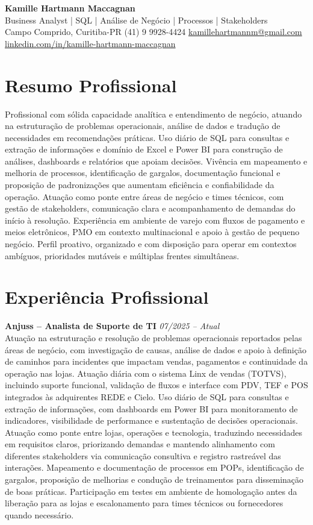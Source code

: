 \documentclass[11pt,a4paper]{article}
\newcommand{\cvheader}[4]{%
  \begin{center}
    {\LARGE\bfseries #1}\\[4pt]
    {\large #2}\\[6pt]
    #3\\[2pt]
    #4
  \end{center}
  \vspace{4pt}
}
\newcommand{\experience}[3]{%
  \textbf{#1} \hfill \textit{#2}\\[4pt]
  #3
  \vspace{8pt}
}
\begin{document}
\cvheader{Kamille Hartmann Maccagnan}%
{Business Analyst | SQL | Análise de Negócio | Processos | Stakeholders}%
{Campo Comprido, Curitiba-PR \textbullet{} (41) 9 9928-4424 \textbullet{} \href{mailto:kamillehartmannm@gmail.com}{kamillehartmannm@gmail.com}}%
{\href{https://linkedin.com/in/kamille-hartmann-maccagnan/}{linkedin.com/in/kamille-hartmann-maccagnan}}

\section*{Resumo Profissional}

Profissional com sólida capacidade analítica e entendimento de negócio, atuando na estruturação de problemas operacionais, análise de dados e tradução de necessidades em recomendações práticas. Uso diário de SQL para consultas e extração de informações e domínio de Excel e Power BI para construção de análises, dashboards e relatórios que apoiam decisões. Vivência em mapeamento e melhoria de processos, identificação de gargalos, documentação funcional e proposição de padronizações que aumentam eficiência e confiabilidade da operação. Atuação como ponte entre áreas de negócio e times técnicos, com gestão de stakeholders, comunicação clara e acompanhamento de demandas do início à resolução. Experiência em ambiente de varejo com fluxos de pagamento e meios eletrônicos, PMO em contexto multinacional e apoio à gestão de pequeno negócio. Perfil proativo, organizado e com disposição para operar em contextos ambíguos, prioridades mutáveis e múltiplas frentes simultâneas.

\section*{Experiência Profissional}

\experience{Anjuss -- Analista de Suporte de TI}{07/2025 -- Atual}{%
Atuação na estruturação e resolução de problemas operacionais reportados pelas áreas de negócio, com investigação de causas, análise de dados e apoio à definição de caminhos para incidentes que impactam vendas, pagamentos e continuidade da operação nas lojas. Atuação diária com o sistema Linx de vendas (TOTVS), incluindo suporte funcional, validação de fluxos e interface com PDV, TEF e POS integrados às adquirentes REDE e Cielo. Uso diário de SQL para consultas e extração de informações, com dashboards em Power BI para monitoramento de indicadores, visibilidade de performance e sustentação de decisões operacionais. Atuação como ponte entre lojas, operações e tecnologia, traduzindo necessidades em requisitos claros, priorizando demandas e mantendo alinhamento com diferentes stakeholders via comunicação consultiva e registro rastreável das interações. Mapeamento e documentação de processos em POPs, identificação de gargalos, proposição de melhorias e condução de treinamentos para disseminação de boas práticas. Participação em testes em ambiente de homologação antes da liberação para as lojas e escalonamento para times técnicos ou fornecedores quando necessário.}
\end{document}
